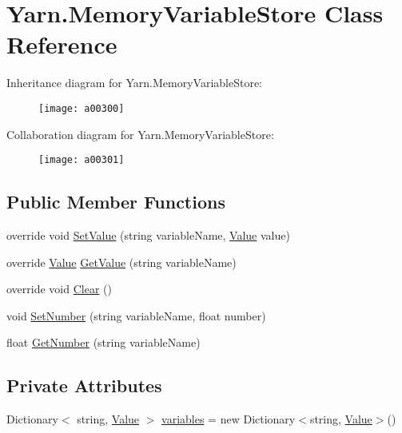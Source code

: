 \hypertarget{a00052}{\section{Yarn.\-Memory\-Variable\-Store Class Reference}
\label{a00052}
}


Inheritance diagram for Yarn.\-Memory\-Variable\-Store\-:
\nopagebreak
\begin{figure}[H]
\begin{center}
\leavevmode
\texttt{[image: a00300]}
\end{center}
\end{figure}


Collaboration diagram for Yarn.\-Memory\-Variable\-Store\-:
\nopagebreak
\begin{figure}[H]
\begin{center}
\leavevmode
\texttt{[image: a00301]}
\end{center}
\end{figure}
\subsection*{Public Member Functions}
\begin{DoxyCompactItemize}
\item 
override void \hyperlink{a00052_a653a459811e5c19549f4b31269093ef5}{Set\-Value} (string variable\-Name, \hyperlink{a00086}{Value} value)
\item 
override \hyperlink{a00086}{Value} \hyperlink{a00052_a0ce77e8245c504a777540e359704aa2a}{Get\-Value} (string variable\-Name)
\item 
override void \hyperlink{a00052_aa6d243e7ef02b91f793a221f509dae69}{Clear} ()
\item 
void \hyperlink{a00021_a48b93de9cd7ae61d0cd9583c8330d3ee}{Set\-Number} (string variable\-Name, float number)
\item 
float \hyperlink{a00021_a1b7f7f4468b2463e7b47986d99362279}{Get\-Number} (string variable\-Name)
\end{DoxyCompactItemize}
\subsection*{Private Attributes}
\begin{DoxyCompactItemize}
\item 
Dictionary$<$ string, \hyperlink{a00086}{Value} $>$ \hyperlink{a00052_aad18acd95297edb8ed496857337f8071}{variables} = new Dictionary$<$string, \hyperlink{a00086}{Value}$>$()
\end{DoxyCompactItemize}


